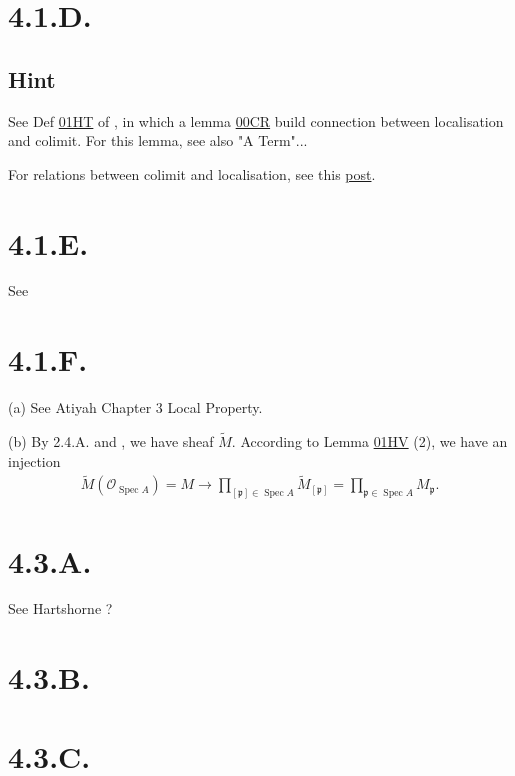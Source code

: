 \section{4.1.D.}\label{4.1.D.}

\subsection{Hint}
See Def \href{https://stacks.math.columbia.edu/tag/01HR}{01HT} of \cite{stacks-project}, in which a lemma \href{https://stacks.math.columbia.edu/tag/00CR}{00CR} build connection between localisation and colimit. For this lemma, see also "A Term"... 

For relations between colimit and localisation, see this \href{https://math.stackexchange.com/questions/664471/representing-localization-as-a-direct-limit}{post}.

\section{4.1.E.}\label{4.1.E.}

See 

\section{4.1.F.}\label{4.1.F.}

(a) See Atiyah \cite{atiyah1994introduction} Chapter 3 Local Property.

(b) By 2.4.A. and , we have sheaf $\widetilde M$. According to Lemma \href{https://stacks.math.columbia.edu/tag/01HR}{01HV} (2), we have an injection
\begin{align*}
	\widetilde M (\mathcal O_{\operatorname{Spec}A})=M \to \prod_{[\mathfrak p]\in \operatorname{Spec}A} \widetilde M_{[\mathfrak p]}=\prod_{\mathfrak p\in\operatorname{Spec}A}M_{\mathfrak p}.
\end{align*} 

\section{4.3.A.}\label{4.3.A.}

See Hartshorne \cite{hartshorne2013algebraic}?

\section{4.3.B.}\label{4.3.B.}
\section{4.3.C.}
